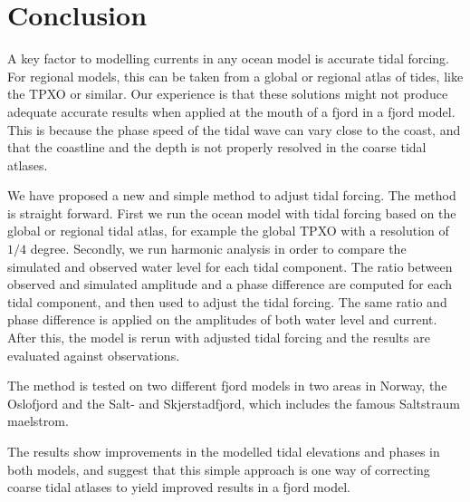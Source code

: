 \section{Conclusion}

A key factor to modelling currents in any ocean model is accurate tidal forcing. For regional models, this can be taken from a global or regional atlas of tides, like the TPXO or similar. Our experience is that these solutions might not produce adequate accurate results when applied at the mouth of a fjord in a fjord model. This is because the phase speed of the tidal wave can vary close to the coast, and that the coastline and the depth is not properly resolved in the coarse tidal atlases.

We have proposed a new and simple method to adjust tidal forcing. The method is straight forward. First we run the ocean model with tidal forcing based on the global or regional tidal atlas, for example the global TPXO with a resolution of $1/4$ degree. Secondly, we run harmonic analysis in order to compare the simulated and observed water level for each tidal component. The ratio between observed and simulated amplitude and a phase difference are computed for each tidal component, and then used to adjust the tidal forcing. The same ratio and phase difference is applied on the amplitudes of both water level and current. After this, the model is rerun with adjusted tidal forcing and the results are evaluated against observations.

The method is tested on two different fjord models in two areas in Norway, the Oslofjord and the Salt- and Skjerstadfjord, which includes the famous Saltstraum maelstrom.
 
The results show improvements in the modelled tidal elevations and phases in both models, and suggest that this simple approach is one way of correcting coarse tidal atlases to yield improved results in a fjord model.
